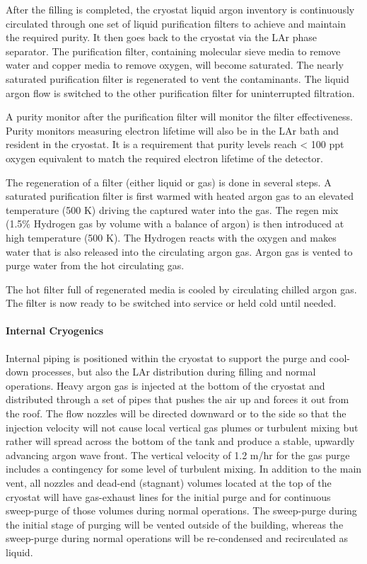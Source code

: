 After the filling is completed, the cryostat liquid argon inventory is continuously circulated through one set of liquid purification filters to achieve and maintain the required purity. It then goes back to the cryostat via the LAr phase separator. The purification filter, containing molecular sieve media to remove water and copper media to remove oxygen, will become saturated. The nearly saturated purification filter is regenerated to vent the contaminants. The liquid argon flow is switched to the other purification filter for uninterrupted filtration.

A purity monitor after the purification filter will monitor the filter effectiveness. Purity monitors measuring electron lifetime will also be in the LAr bath and resident in the cryostat. It is a requirement that purity levels reach < 100 ppt oxygen equivalent to match the required electron lifetime of the detector. 

The regeneration of a filter (either liquid or gas) is done in several steps. A saturated purification filter is first warmed with heated argon gas to an elevated temperature (500 K) driving the captured water into the gas. The regen mix (1.5\% Hydrogen gas by volume with a balance of argon) is then introduced at high temperature (500 K). The Hydrogen reacts with the oxygen and makes water that is also released into the circulating argon gas. Argon gas is vented to purge water from the hot circulating gas. 

The hot filter full of regenerated media is cooled by circulating chilled argon gas. The filter is now ready to be switched into service or held cold until needed. 

\paragraph{Internal Cryogenics}

Internal piping is positioned within the cryostat to support the purge and cool-down processes, but also the LAr distribution during filling and normal operations. Heavy argon gas is injected at the bottom of the cryostat and distributed through a set of pipes that pushes the air up and forces it out from the roof. The flow nozzles will be directed downward or to the side so that the injection velocity will not cause local vertical gas plumes or turbulent mixing but rather will spread across the bottom of the tank and produce a stable, upwardly advancing argon wave front. The vertical velocity of 1.2 m/hr for the gas purge includes a contingency for some level of turbulent mixing. In addition to the main vent, all nozzles and dead-end (stagnant) volumes located at the top of the cryostat will have gas-exhaust lines for the initial purge and for continuous sweep-purge of those volumes during normal operations. The sweep-purge during the initial stage of purging will be vented outside of the building, whereas the sweep-purge during normal operations will be re-condensed and recirculated as liquid. 


